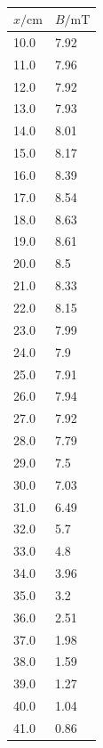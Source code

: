 \documentclass[11pt,ngerman,a4paper]{article}
\begin{document}
\begin{table}
\centering
\begin{tabular}{ll}
\toprule
{$x / \si{\centi\meter}$} &{ $B/\si{\milli\tesla}$ }\\
\midrule
10.0 & 7.92\\
11.0 & 7.96\\
12.0 & 7.92\\
13.0 & 7.93\\
14.0 & 8.01\\
15.0 & 8.17\\
16.0 & 8.39\\
17.0 & 8.54\\
18.0 & 8.63\\
19.0 & 8.61\\
20.0 & 8.5\\
21.0 & 8.33\\
22.0 & 8.15\\
23.0 & 7.99\\
24.0 & 7.9\\
25.0 & 7.91\\
26.0 & 7.94\\
27.0 & 7.92\\
28.0 & 7.79\\
29.0 & 7.5\\
30.0 & 7.03\\
31.0 & 6.49\\
32.0 & 5.7\\
33.0 & 4.8\\
34.0 & 3.96\\
35.0 & 3.2\\
36.0 & 2.51\\
37.0 & 1.98\\
38.0 & 1.59\\
39.0 & 1.27\\
40.0 & 1.04\\
41.0 & 0.86\\
\bottomrule
\end{tabular}
\label{}
\caption{}
\end{table}
\end{document}
